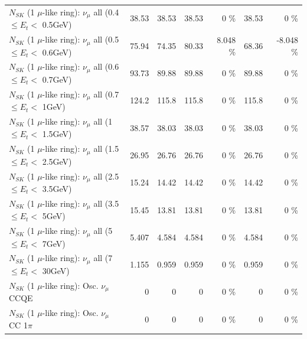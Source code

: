 \begin{table}
\begin{tabular}{| l | r | r | r  r | r  r |}
       $N_{SK}$ (1 $\mu$-like ring): $\nu_{\mu}$ all (0.4 $\leq E_{t} <$ 0.5GeV) &           38.53 &           38.53 &           38.53 &        0 \%  &           38.53 &        0 \%  \\ 
       $N_{SK}$ (1 $\mu$-like ring): $\nu_{\mu}$ all (0.5 $\leq E_{t} <$ 0.6GeV) &           75.94 &           74.35 &           80.33 &    8.048 \%  &           68.36 &   -8.048 \%  \\ 
       $N_{SK}$ (1 $\mu$-like ring): $\nu_{\mu}$ all (0.6 $\leq E_{t} <$ 0.7GeV) &           93.73 &           89.88 &           89.88 &        0 \%  &           89.88 &        0 \%  \\ 
         $N_{SK}$ (1 $\mu$-like ring): $\nu_{\mu}$ all (0.7 $\leq E_{t} <$ 1GeV) &           124.2 &           115.8 &           115.8 &        0 \%  &           115.8 &        0 \%  \\ 
         $N_{SK}$ (1 $\mu$-like ring): $\nu_{\mu}$ all (1 $\leq E_{t} <$ 1.5GeV) &           38.57 &           38.03 &           38.03 &        0 \%  &           38.03 &        0 \%  \\ 
       $N_{SK}$ (1 $\mu$-like ring): $\nu_{\mu}$ all (1.5 $\leq E_{t} <$ 2.5GeV) &           26.95 &           26.76 &           26.76 &        0 \%  &           26.76 &        0 \%  \\ 
       $N_{SK}$ (1 $\mu$-like ring): $\nu_{\mu}$ all (2.5 $\leq E_{t} <$ 3.5GeV) &           15.24 &           14.42 &           14.42 &        0 \%  &           14.42 &        0 \%  \\ 
         $N_{SK}$ (1 $\mu$-like ring): $\nu_{\mu}$ all (3.5 $\leq E_{t} <$ 5GeV) &           15.45 &           13.81 &           13.81 &        0 \%  &           13.81 &        0 \%  \\ 
           $N_{SK}$ (1 $\mu$-like ring): $\nu_{\mu}$ all (5 $\leq E_{t} <$ 7GeV) &           5.407 &           4.584 &           4.584 &        0 \%  &           4.584 &        0 \%  \\ 
          $N_{SK}$ (1 $\mu$-like ring): $\nu_{\mu}$ all (7 $\leq E_{t} <$ 30GeV) &           1.155 &           0.959 &           0.959 &        0 \%  &           0.959 &        0 \%  \\ 
\hline
\hline
                               $N_{SK}$ (1 $\mu$-like ring): Osc. $\nu_\mu$ CCQE &               0 &               0 &               0 &        0 \%  &               0 &        0 \%  \\ 
                          $N_{SK}$ (1 $\mu$-like ring): Osc. $\nu_\mu$ CC 1$\pi$ &               0 &               0 &               0 &        0 \%  &               0 &        0 \%  \\ 

\end{tabular}
\end{table}
